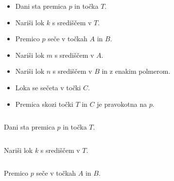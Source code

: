 \begin{itemize}
	\item Dani sta premica $p$ in točka $T$.
	\item Nariši lok $k$ s središčem v $T$.
	\item Premico $p$ seče v točkah $A$ in $B$.
	\item Nariši lok $m$ s središčem v $A$.
	\item Nariši lok $n$ s središčem v $B$ in z enakim polmerom.
	\item Loka se sečeta v točki $C$.
	\item Premica skozi točki $T$ in $C$ je pravokotna na $p$.
 \end{itemize}
\begin{columns}
\begin{column}{0.55\textwidth}
Dani sta premica $p$ in točka $T$.
\end{column}
\begin{column}{0.45\textwidth}
\centering
{}
\end{column}
\end{columns}

 
\begin{columns}
\begin{column}{0.55\textwidth}
   Nariši lok $k$ s središčem v $T$.
\end{column}
   \begin{column}{0.45\textwidth}
	   \centering
   \end{column}
\end{columns}


\begin{columns}
   \begin{column}{0.55\textwidth}
	   Premico $p$ seče v točkah $A$ in $B$.
   \end{column}
	   \begin{column}{0.45\textwidth}
		   \centering
		   \begin{tikzpicture}
			
		   \end{tikzpicture}
	   \end{column}
   \end{columns}


